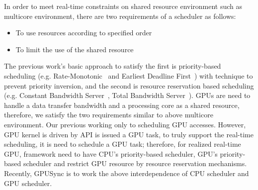 In order to meet real-time constraints on shared resource environment such as multicore environment,
there are two requirements of a scheduler as follows:
\begin{itemize}
\item To use resources according to specified order
\item To limit the use of the shared resource
\end{itemize}
The previous work's basic approach to satisfy the first is priority-based scheduling (e.g. Rate-Monotonic~\cite{sched:rm} and Earliest Deadline First~\cite{sched:edf}) with technique to prevent priority inversion,
and the second is resource reservation based scheduling (e.g. Constant Bandwidth Server~\cite{rr:cbs}, Total Bandwidth Server~\cite{rr:tbs2}).
GPUs are need to handle a data transfer bandwidth and a processing core as a shared resource,
therefore, we satisfy the two requirements similar to above multicore environment.
Our previous working only to scheduling GPU accesses.
However, GPU kernel is driven by API is issued a GPU task,
to truly support  the real-time scheduling, it is need to schedule a GPU task;
therefore, for realized real-time GPU, framework need to have CPU's priority-based scheduler, GPU's priority-based scheduler and restrict GPU resource by resource reservation mechanisms.
Recently, GPUSync is to work the above interdependence of CPU scheduler and GPU scheduler.

